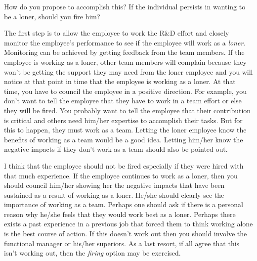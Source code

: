 \documentclass[letterpaper,10pt]{article}
\begin{document}
How do you propose to accomplish this?  If the individual persists in wanting to be a loner, should you fire him?

The first step is to allow the employee to work the R\&D effort and closely monitor the employee's performance to see if the employee will work as a \emph{loner}.   Monitoring can be achieved by getting feedback from the team members.  If the employee is working as a loner, other team members will complain because they won't be getting the support they may need from the loner employee and you will notice at that point in time that the employee is working as a loner.  At that time, you have to council the employee in a positive direction.  For example, you don't want to tell the employee that they have to work in a team effort or else they will be fired.  You probably want to tell the employee that their contribution is critical and others need him/her expertise to accomplish their tasks.  But for this to happen, they must work as a team.  Letting the loner employee know the benefits of working as a team would be a good idea.  Letting him/her know the negative impacts if they don't work as a team should also be pointed out.  

I think that the employee should not be fired especially if they were hired with that much experience.  If the employee continues to work as a loner, then you should council him/her showing her the negative impacts that have been sustained as a result of working as a loner.  He/she should clearly see the importance of working as a team.  Perhaps one should ask if there is a personal reason why he/she feels that they would work best as a loner.  Perhaps there exists a past experience in a previous job that forced them to think working alone is the best course of action.  If this doesn't work out then you should involve the functional manager or his/her superiors.  As a last resort, if all agree that this isn't working out, then the \emph{firing} option may be exercised.
\end{document}
